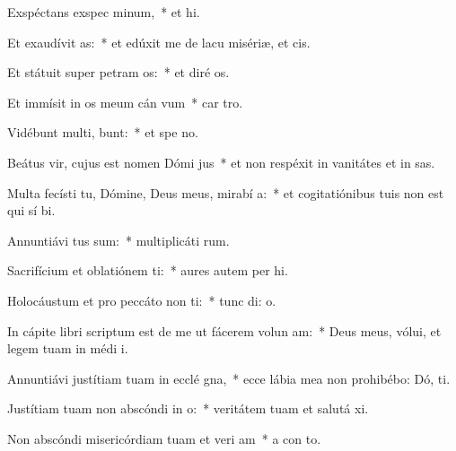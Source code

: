 \item Exspéctans exspec minum,~* et  hi.
\item Et exaudívit  as:~* et edúxit me de lacu misériæ, et   cis.
\item Et státuit super petram  os:~* et diré  os.
\item Et immísit in os meum cán vum~* car  tro.
\item Vidébunt multi,  bunt:~* et spe  no.
\item Beátus vir, cujus est nomen Dómi  jus~* et non respéxit in vanitátes et in sas.
\item Multa fecísti tu, Dómine, Deus meus, mirabí a:~* et cogitatiónibus tuis non est qui sí  bi.
\item Annuntiávi  tus sum:~* multiplicáti   rum.
\item Sacrifícium et oblatiónem ti:~* aures autem per hi.
\item Holocáustum et pro peccáto non ti:~* tunc di:  o.
\item In cápite libri scriptum est de me ut fácerem volun am:~* Deus meus, vólui, et legem tuam in médi  i.
\item Annuntiávi justítiam tuam in ecclé gna,~* ecce lábia mea non prohibébo: Dó,  ti.
\item Justítiam tuam non abscóndi in  o:~* veritátem tuam et salutá  xi.
\item Non abscóndi misericórdiam tuam et veri am~* a con to.
